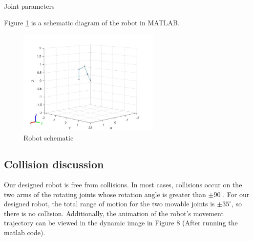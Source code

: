 \begin{minipage}[htbp]{\textwidth}
    \makeatletter{}
    \centering
    \caption{Joint parameters}
    \label{T 2.2} 
\end{minipage}

Figure \ref{F 2.1} is a schematic diagram of the robot in MATLAB.
\begin{figure}[htbp]
    \centering
    \includegraphics[width=7cm]{./fig/1.jpg}
    \caption{Robot schematic}
    \label{F 2.1}
\end{figure}

\subsection{Collision discussion}

Our designed robot is free from collisions. In most cases, collisions occur on the two arms of the rotating joints whose rotation angle is greater than $±90^\circ$. For our designed robot, the total range of motion for the two movable joints is $±35^\circ$, so there is no collision. Additionally, the animation of the robot's movement trajectory can be viewed in the dynamic image in Figure 8 (After running the matlab code).
